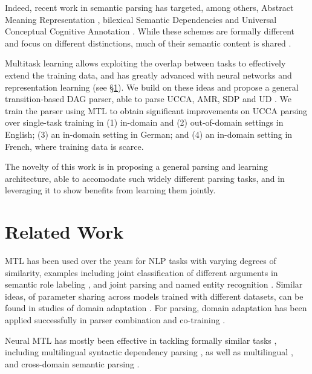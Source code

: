 \documentclass[11pt,a4paper]{article}
\begin{document}
Indeed, recent work in semantic parsing has targeted, among others,
Abstract Meaning Representation \cite[AMR;][]{banarescu2013abstract},
bilexical Semantic Dependencies \cite[SDP;][]{oepen2016towards}
and Universal Conceptual Cognitive Annotation \cite[UCCA;][]{abend2013universal}.
While these schemes are formally different and focus on different distinctions,
much of their semantic content is shared \cite{abend2017state}.

Multitask learning \cite[MTL; ][]{caruana1998multitask} allows exploiting the overlap between tasks
to effectively extend the training data, 
and has greatly advanced with neural networks and representation learning
(see \S\ref{sec:related_work}).
We build on these ideas and propose a general transition-based DAG parser,
able to parse UCCA, AMR, SDP and UD \cite{nivre2016universal}.
We train the parser using MTL to obtain significant improvements
on UCCA parsing over single-task training in
(1) in-domain and (2) out-of-domain settings in English;
(3) an in-domain setting in German; and
(4) an in-domain setting in French, where training data is
scarce.

The novelty of this work is in proposing a general parsing and learning
architecture, able to accomodate such widely different parsing tasks, and in leveraging it
to show benefits from learning them jointly.



\section{Related Work}\label{sec:related_work}

MTL has been used over the years for NLP tasks with varying degrees of similarity,
examples including joint classification of different arguments in 
semantic role labeling \cite{toutanova2005joint},
and joint parsing and named entity recognition \cite{Finkel2009JointPA}.
Similar ideas, of parameter sharing across models trained with different datasets,
can be found in studies of domain adaptation \cite{W06-1615,P07-1033,K17-1040}.
For parsing, domain adaptation has been applied successfully in
parser combination and co-training \cite{mcclosky2010automatic,baucom2013domain}.

Neural MTL has mostly been effective in tackling formally similar
tasks \cite{P16-2038},
including
multilingual syntactic dependency parsing \cite{Q16-1031,guo2016exploiting},
as well as multilingual \cite{duong2017multilingual},
and cross-domain semantic parsing \cite{herzig-berant:2017:Short,W17-2607}.
\end{document}
